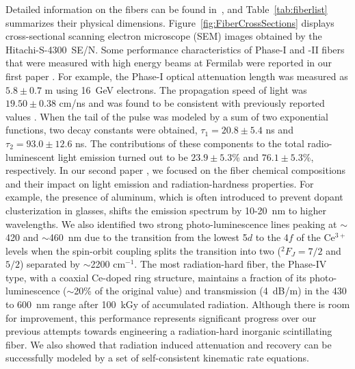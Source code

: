 \documentclass[a4paper,11pt]{article}
\begin{document}
Detailed information on the fibers can be found in~\cite{JINSTPaper}, and Table~\ref{tab:fiberlist} summarizes their physical dimensions.  Figure~\ref{fig:FiberCrossSections} displays cross-sectional scanning electron microscope (SEM) images obtained by the Hitachi-S-4300~SE/N.  Some performance characteristics of Phase-I and -II fibers that were measured with high energy beams at Fermilab were reported in our first paper \cite{JINSTPaper}.  For example, the Phase-I optical attenuation length was measured as $5.8\pm0.7$ m using 16~GeV  electrons.  The propagation speed of light was $19.50\pm0.38$ cm/ns and was found to be consistent with previously reported values \cite{Goro,Akch97}.  When the tail of the pulse was modeled by a sum of two exponential functions, two decay constants were obtained, $\tau_1= 20.8\pm5.4$ ns and $\tau_2= 93.0\pm12.6$ ns.  The contributions of these components to the total radio-luminescent light emission turned out to be $23.9\pm5.3$\% and $76.1\pm5.3$\%, respectively.  In our second paper \cite{JINSTPaper2}, we focused on the fiber chemical compositions and their impact on light emission and radiation-hardness properties.  For example, the presence of aluminum, which is often introduced to prevent dopant clusterization in glasses, shifts the emission spectrum by 10-20~nm to higher wavelengths.  We also identified two strong photo-luminescence lines peaking at $\sim$420 and $\sim$460~nm due to the transition from the lowest 5$d$ to the 4$f$ of the Ce$^{3+}$ levels when the spin-orbit coupling splits the transition into two ($^2F_{J}=7/2$ and $5/2$) separated by $\sim$2200 cm$^{-1}$. The most radiation-hard fiber, the Phase-IV type, with a coaxial Ce-doped ring structure, maintains a fraction of its photo-luminescence ($\sim$20\% of the original value) and transmission (4~dB/m) in the 430 to 600~nm range after 100~kGy of accumulated radiation. Although there is room for improvement, this performance represents significant progress over our previous attempts towards engineering a radiation-hard inorganic scintillating  fiber.  We also showed that radiation induced attenuation and recovery can be successfully modeled by a set of self-consistent kinematic rate equations.
\end{document}
